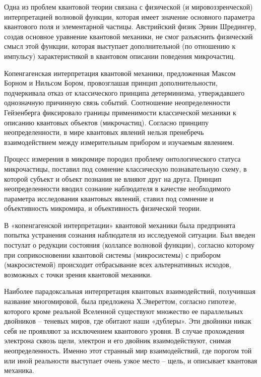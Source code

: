 \documentclass[exam_answers.tex]{subfiles}
\begin{document}
Одна из проблем квантовой теории связана с физической (и
мировоззренческой) интерпретацией волновой функции, которая имеет
значение основного параметра квантового поля и элементарной частицы.
Австрийский физик Эрвин Шредингер, создав основное уравнение квантовой
механики, не смог разъяснить физический смысл этой функции, которая
выступает дополнительной (по отношению к импульсу) характеристикой в
квантовом описании поведения микрочастиц.

Копенгагенская интерпретация квантовой механики, предложенная
Максом Борном и Нильсом Бором, провозглашая принцип дополнительности,
подчеркивала отказ от классического принципа детерминизма, утверждавшего
однозначную причинную связь событий. Соотношение неопределенности
Гейзенберга фиксировало границы применимости классической механики к
описанию квантовых объектов (микрочастиц). Согласно принципу
неопределенности, в мире квантовых явлений нельзя пренебречь
взаимодействием между измерительным прибором и изучаемым явлением.

Процесс измерения в микромире породил проблему онтологического
статуса микрочастицы, поставил под сомнение классическую познавательную
схему, в которой субъект и объект познания не влияют друг на друга. Принцип
неопределенности вводил сознание наблюдателя в качестве необходимого
параметра исследования квантовых явлений, ставил под сомнение и
объективность микромира, и объективность физической теории.

В «копенгагенской интерпретации» квантовой механики была предпринята
попытка устранения сознания наблюдателя из исследуемой ситуации. Был
введен постулат о редукции состояния (коллапсе волновой функции), согласно
которому при соприкосновении квантовой системы (микросистемы) с
прибором (макросистемой) происходит отбрасывание всех альтернативных
исходов, возможных с точки зрения квантовой механики.

Наиболее парадоксальная интерпретация квантовых взаимодействий,
получившая название многомировой, была предложена Х.Эвереттом, согласно
гипотезе, которого кроме реальной Вселенной существуют множество ее
параллельных двойников – теневых миров, где обитают наши «дублеры». Эти
двойники никак себя не проявляют за исключением квантового уровня. В
случае прохождения электрона сквозь щели, электрон и его двойник
взаимодействуют, снимая неопределенность. Именно этот странный мир
взаимодействий, где порогом той или иной реальности выступает очень узкое
место – щель, и описывает квантовая механика.
\end{document}
